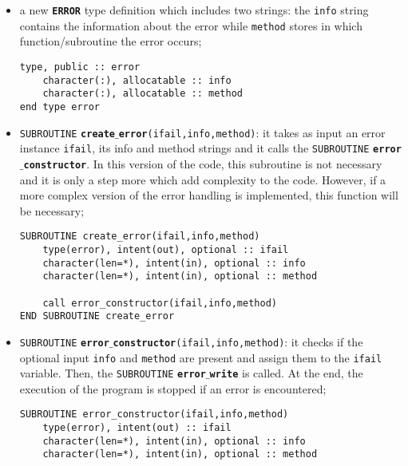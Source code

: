 \documentclass[rmp,10pt,onecolumn,fleqn,notitlepage]{revtex4-1}
\begin{document}
\begin{itemize}
    \item a new {\bfseries\texttt{ERROR}} type definition which includes two strings: the \texttt{info} string contains the information about the error while \texttt{method} stores in which function/subroutine the error occurs;

    \begin{minipage}[t]{0.40\linewidth}%
    \begin{lstlisting}[style=Fortran]
type, public :: error
    character(:), allocatable :: info
    character(:), allocatable :: method
end type error\end{lstlisting}
    \end{minipage}

    \item \texttt{SUBROUTINE} {\bfseries\texttt{create$\_$error}}\texttt{(ifail,info,method)}: it takes as input an error instance \texttt{ifail}, its info and method strings and it calls the \texttt{SUBROUTINE} {\bfseries\texttt{error$\_$constructor}}. In this version of the code, this subroutine is not necessary and it is only a step more which add complexity to the code. However, if a more complex version of the error handling is implemented, this function will be necessary;

    \begin{minipage}[t]{0.55\linewidth}%
    \begin{lstlisting}[style=Fortran]
SUBROUTINE create_error(ifail,info,method)
    type(error), intent(out), optional :: ifail
    character(len=*), intent(in), optional :: info
    character(len=*), intent(in), optional :: method

    call error_constructor(ifail,info,method)
END SUBROUTINE create_error\end{lstlisting}
    \end{minipage}

    \item \texttt{SUBROUTINE} {\bfseries\texttt{error$\_$constructor}}\texttt{(ifail,info,method)}: it checks if the optional input \texttt{info} and \texttt{method} are present and assign them to the \texttt{ifail} variable. Then, the \texttt{SUBROUTINE} {\bfseries\texttt{error$\_$write}} is called. At the end, the execution of the program is stopped if an error is encountered;

    \begin{minipage}[t]{0.76\linewidth}%
    \begin{lstlisting}[style=Fortran]
SUBROUTINE error_constructor(ifail,info,method)
    type(error), intent(out) :: ifail
    character(len=*), intent(in), optional :: info
    character(len=*), intent(in), optional :: method


\end{lstlisting}
\end{minipage}
\end{itemize}
\end{document}
